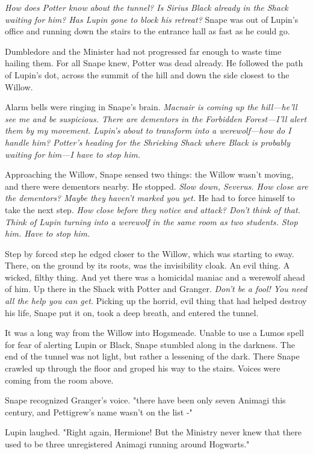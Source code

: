\emph{How does Potter know about the tunnel? Is Sirius Black already in the Shack waiting for him? Has Lupin gone to block his retreat?} Snape was out of Lupin's office and running down the stairs to the entrance hall as fast as he could go.

Dumbledore and the Minister had not progressed far enough to waste time hailing them. For all Snape knew, Potter was dead already. He followed the path of Lupin's dot, across the summit of the hill and down the side closest to the Willow.

Alarm bells were ringing in Snape's brain. \emph{Macnair is coming up the hill—he'll see me and be suspicious. There are dementors in the Forbidden Forest—I'll alert them by my movement. Lupin's about to transform into a werewolf—how do I handle him? Potter's heading for the Shrieking Shack where Black is probably waiting for him—I have to stop him.}

Approaching the Willow, Snape sensed two things: the Willow wasn't moving, and there were dementors nearby. He stopped. \emph{Slow down, Severus. How close are the dementors? Maybe they haven't marked you yet.} He had to force himself to take the next step. \emph{How close before they notice and attack? Don't think of that. Think of Lupin turning into a werewolf in the same room as two students. Stop him. Have to stop him.}

Step by forced step he edged closer to the Willow, which was starting to sway. There, on the ground by its roots, was the invisibility cloak. An evil thing. A wicked, filthy thing. And yet there was a homicidal maniac and a werewolf ahead of him. Up there in the Shack with Potter and Granger. \emph{Don't be a fool! You need all the help you can get.} Picking up the horrid, evil thing that had helped destroy his life, Snape put it on, took a deep breath, and entered the tunnel.

It was a long way from the Willow into Hogsmeade. Unable to use a Lumos spell for fear of alerting Lupin or Black, Snape stumbled along in the darkness. The end of the tunnel was not light, but rather a lessening of the dark. There Snape crawled up through the floor and groped his way to the stairs. Voices were coming from the room above.

Snape recognized Granger's voice. "{\el}there have been only seven Animagi this century, and Pettigrew's name wasn't on the list -"

Lupin laughed. "Right again, Hermione! But the Ministry never knew that there used to be three unregistered Animagi running around Hogwarts."

